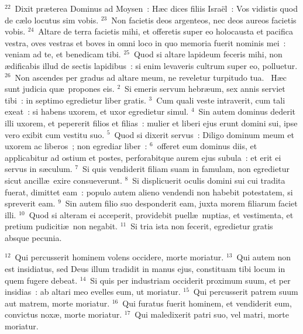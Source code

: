 ${}^{22}$~Dixit pr\ae terea Dominus ad Moysen~: H\ae c dices filiis Isra\"el~: Vos vidistis quod de c\ae lo locutus sim vobis.
${}^{23}$~Non facietis deos argenteos, nec deos aureos facietis vobis.
${}^{24}$~Altare de terra facietis mihi, et offeretis super eo holocausta et pacifica vestra, oves vestras et boves in omni loco in quo memoria fuerit nominis mei~: veniam ad te, et benedicam tibi.
${}^{25}$~Quod si altare lapideum feceris mihi, non \ae dificabis illud de sectis lapidibus~: si enim levaveris cultrum super eo, polluetur.
${}^{26}$~Non ascendes per gradus ad altare meum, ne reveletur turpitudo tua.
~\lettrine[lines=10,image=true,loversize=0.05,lraise=-0.03]{H}{}\ae c sunt judicia qu\ae\ propones eis.
${}^{2}$~Si emeris servum hebr\ae um, sex annis serviet tibi~: in septimo egredietur liber gratis.
${}^{3}$~Cum quali veste intraverit, cum tali exeat~: si habens uxorem, et uxor egredietur simul.
${}^{4}$~Sin autem dominus dederit illi uxorem, et pepererit filios et filias~: mulier et liberi ejus erunt domini sui, ipse vero exibit cum vestitu suo.
${}^{5}$~Quod si dixerit servus~: Diligo dominum meum et uxorem ac liberos~; non egrediar liber~:
${}^{6}$~offeret eum dominus diis, et applicabitur ad ostium et postes, perforabitque aurem ejus subula~: et erit ei servus in s\ae culum.
${}^{7}$~Si quis vendiderit filiam suam in famulam, non egredietur sicut ancill\ae\ exire consueverunt.
${}^{8}$~Si displicuerit oculis domini sui cui tradita fuerat, dimittet eam~: populo autem alieno vendendi non habebit potestatem, si spreverit eam.
${}^{9}$~Sin autem filio suo desponderit eam, juxta morem filiarum faciet illi.
${}^{10}$~Quod si alteram ei acceperit, providebit puell\ae\ nuptias, et vestimenta, et pretium pudiciti\ae\ non negabit.
${}^{11}$~Si tria ista non fecerit, egredietur gratis absque pecunia.


${}^{12}$~Qui percusserit hominem volens occidere, morte moriatur.
${}^{13}$~Qui autem non est insidiatus, sed Deus illum tradidit in manus ejus, constituam tibi locum in quem fugere debeat.
${}^{14}$~Si quis per industriam occiderit proximum suum, et per insidias~: ab altari meo evelles eum, ut moriatur.
${}^{15}$~Qui percusserit patrem suum aut matrem, morte moriatur.
${}^{16}$~Qui furatus fuerit hominem, et vendiderit eum, convictus nox\ae , morte moriatur.
${}^{17}$~Qui maledixerit patri suo, vel matri, morte moriatur.


